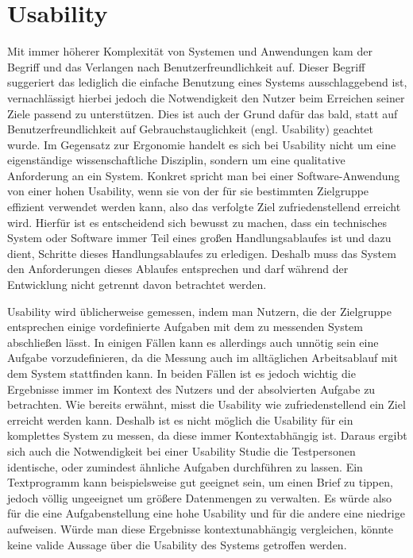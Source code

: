 \section{Usability}
Mit immer höherer Komplexität von Systemen und Anwendungen kam der Begriff und das Verlangen nach  \glqq Benutzerfreundlichkeit\grqq{} auf.
Dieser Begriff suggeriert das lediglich die einfache Benutzung eines Systems ausschlaggebend ist, vernachlässigt hierbei jedoch die Notwendigkeit den Nutzer beim Erreichen seiner Ziele passend zu unterstützen.
Dies ist auch der Grund dafür das bald, statt auf \glqq Benutzerfreundlichkeit\grqq{}  auf \glqq Gebrauchstauglichkeit\grqq{}  (engl. Usability) geachtet wurde.
Im Gegensatz zur Ergonomie handelt es sich bei Usability nicht um eine eigenständige wissenschaftliche Disziplin, sondern um eine qualitative Anforderung an ein System\cite{Sarodnick.2016}.
Konkret spricht man bei einer Software-Anwendung von einer hohen Usability, wenn sie von der für sie bestimmten Zielgruppe effizient verwendet werden kann, also das verfolgte Ziel zufriedenstellend erreicht wird\cite{Richter.2016}.
Hierfür ist es entscheidend sich bewusst zu machen, dass ein technisches System oder Software immer Teil eines großen Handlungsablaufes ist und dazu dient, Schritte dieses Handlungsablaufes zu erledigen.
Deshalb muss das System den Anforderungen dieses Ablaufes entsprechen und darf während der Entwicklung nicht getrennt davon betrachtet werden\cite{Sarodnick.2016}.

Usability wird üblicherweise gemessen, indem man Nutzern, die der Zielgruppe entsprechen einige vordefinierte Aufgaben mit dem zu messenden System abschließen lässt. 
In einigen Fällen kann es allerdings auch unnötig sein eine Aufgabe vorzudefinieren, da die Messung auch im alltäglichen Arbeitsablauf mit dem System stattfinden kann.
In beiden Fällen ist es jedoch wichtig die Ergebnisse immer im Kontext des Nutzers und der absolvierten Aufgabe zu betrachten\cite{Nielsen.1995?}. 
Wie bereits erwähnt, misst die Usability wie zufriedenstellend ein Ziel erreicht werden kann.
Deshalb ist es nicht möglich die Usability für ein komplettes System zu messen, da diese immer Kontextabhängig ist.
Daraus ergibt sich auch die Notwendigkeit bei einer Usability Studie die Testpersonen identische, oder zumindest ähnliche Aufgaben durchführen zu lassen.
Ein Textprogramm kann beispielsweise gut geeignet sein, um einen Brief zu tippen, jedoch völlig ungeeignet um größere Datenmengen zu verwalten. Es würde also für die eine Aufgabenstellung eine hohe Usability und für die andere eine niedrige aufweisen. 
Würde man diese Ergebnisse kontextunabhängig vergleichen, könnte keine valide Aussage über die Usability des Systems getroffen werden.

